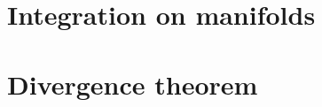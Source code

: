 \documentclass{wongtreebook}
\begin{document}


\chapter{Integration on manifolds}

\chapter{Divergence theorem}


\end{document}

